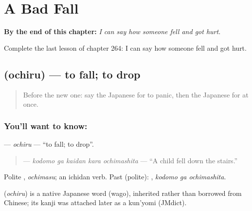 
\chapter{A Bad Fall}
\label{ch:ja-a-bad-fall}

\begin{chapteropening}
\textbf{By the end of this chapter:} \emph{I can say how someone fell and got hurt.}

Complete the last lesson of chapter 264: I can say how someone fell and got hurt.
\end{chapteropening}

\section[\texorpdfstring{\ja{おちる} (ochiru)}{おちる (ochiru)}]{ (ochiru) — to fall; to drop}

\label{lesson:JA-C264-ochiru}



\begin{quote}
Before the new one: say the Japanese for to panic, then the Japanese for at once.
\end{quote}

\subsection*{You'll want to know: }
\textbf{} — \emph{ochiru} — \textquotedblleft{}to fall; to drop\textquotedblright{}.

\begin{quote}
\textbf{  } — \emph{kodomo ga kaidan kara ochimashita} — \textquotedblleft{}A child fell down the stairs.\textquotedblright{}
\end{quote}

Polite \textbf{}, \emph{ochimasu}; an ichidan verb. Past (polite): \textbf{ }, \emph{kodomo ga ochimashita}.

\begin{cousinweb}
\textbf{} (\emph{ochiru}) is a native Japanese word (wago), inherited rather than borrowed from Chinese; its kanji was attached later as a kun'yomi (JMdict).
\end{cousinweb}


